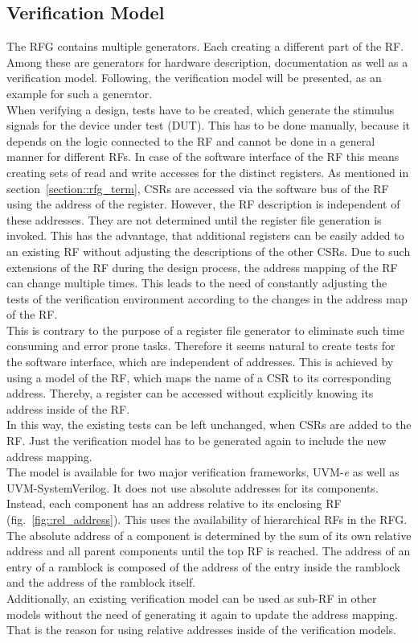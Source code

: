 \subsection{Verification Model}
The RFG contains multiple generators. Each creating a different part of the RF. Among these are generators for hardware description, documentation as well as a verification model. Following, the verification model will be presented, as an example for such a generator.\\
When verifying a design, tests have to be created, which generate the stimulus signals for the device under test (DUT). This has to be done manually, because it depends on the logic connected to the RF and cannot be done in a general manner for different RFs. In case of the software interface of the RF this means creating sets of read and write accesses for the distinct registers. As mentioned in section~\ref{section::rfg_term}, CSRs are accessed via the software bus of the RF using the address of the register. However, the RF description is independent of these addresses. They are not determined until the register file generation is invoked. This has the advantage, that additional registers can be easily added to an existing RF without adjusting the descriptions of the other CSRs. Due to such extensions of the RF during the design process, the address mapping of the RF can change multiple times. This leads to the need of constantly adjusting the tests of the verification environment according to the changes in the address map of the RF.\\
This is contrary to the purpose of a register file generator to eliminate such time consuming and error prone tasks. Therefore it seems natural to create tests for the software interface, which are independent of addresses. This is achieved by using a model of the RF, which maps the name of a CSR to its corresponding address. Thereby, a register can be accessed without explicitly knowing its address inside of the RF.\\
In this way, the existing tests can be left unchanged, when CSRs are added to the RF. Just the verification model has to be generated again to include the new address mapping.\\
The model is available for two major verification frameworks, UVM-\textit{e} as well as UVM-SystemVerilog. It does not use absolute addresses for its components. Instead, each component has an address relative to its enclosing RF (fig.~\ref{fig::rel_address}). This uses the availability of hierarchical RFs in the RFG. The absolute address of a component is determined by the sum of its own relative address and all parent components until the top RF is reached. The address of an entry of a ramblock is composed of the address of the entry inside the ramblock and the address of the ramblock itself.\\ Additionally, an existing verification model can be used as sub-RF in other models without the need of generating it again to update the address mapping. That is the reason for using relative addresses inside of the verification models.
